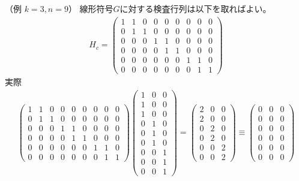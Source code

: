 \documentclass[]{ltjsarticle}
\begin{document}
（例 $k=3, n=9$）
線形符号$G$に対する検査行列は以下を取ればよい。
\begin{align}
    H_c
    =
    \begin{pmatrix}
        1 & 1 & 0 & 0 & 0 & 0 & 0 & 0 & 0 \\
        0 & 1 & 1 & 0 & 0 & 0 & 0 & 0 & 0 \\
        0 & 0 & 0 & 1 & 1 & 0 & 0 & 0 & 0 \\
        0 & 0 & 0 & 0 & 1 & 1 & 0 & 0 & 0 \\
        0 & 0 & 0 & 0 & 0 & 0 & 1 & 1 & 0 \\
        0 & 0 & 0 & 0 & 0 & 0 & 0 & 1 & 1
    \end{pmatrix}
\end{align}
実際
\begin{align}
    \begin{pmatrix}
        1 & 1 & 0 & 0 & 0 & 0 & 0 & 0 & 0 \\
        0 & 1 & 1 & 0 & 0 & 0 & 0 & 0 & 0 \\
        0 & 0 & 0 & 1 & 1 & 0 & 0 & 0 & 0 \\
        0 & 0 & 0 & 0 & 1 & 1 & 0 & 0 & 0 \\
        0 & 0 & 0 & 0 & 0 & 0 & 1 & 1 & 0 \\
        0 & 0 & 0 & 0 & 0 & 0 & 0 & 1 & 1
    \end{pmatrix}    
    \begin{pmatrix}
        1 & 0 & 0 \\
        1 & 0 & 0 \\
        1 & 0 & 0 \\
        0 & 1 & 0 \\
        0 & 1 & 0 \\
        0 & 1 & 0 \\
        0 & 0 & 1 \\
        0 & 0 & 1 \\
        0 & 0 & 1
    \end{pmatrix}
    =
    \begin{pmatrix}
        2 & 0 & 0 \\
        2 & 0 & 0 \\
        0 & 2 & 0 \\
        0 & 2 & 0 \\
        0 & 0 & 2 \\
        0 & 0 & 2
    \end{pmatrix}
    \equiv 
    \begin{pmatrix}
        0 & 0 & 0 \\
        0 & 0 & 0 \\
        0 & 0 & 0 \\
        0 & 0 & 0 \\
        0 & 0 & 0 \\
        0 & 0 & 0
    \end{pmatrix}
\end{align}
\end{document}
